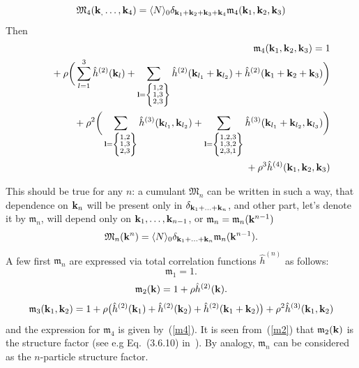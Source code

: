 \begin{equation}
	\mathfrak M_4(\vb k_, \dotsc, \vb k_4) = \langle N \rangle_0 \delta_{\vb k_1 + \vb k_2 + \vb k_3 + \vb k_4} \mathfrak m_4(\vb k_1, \vb k_2, \vb k_3) 
\end{equation}
Then
\begin{eqnarray}
	\label{m4}
	&& \mathfrak m_4(\vb k_1, \vb k_2, \vb k_3) =  1 
	\nonumber\\
	&& \quad{} + \rho \bigg(
	\sum_{l = 1}^3 \hat{h}^{(2)}(\vb k_l) +
	\sum_{\vb l = \left\{\substack{1,2 \\ 1,3 \\ 2,3} \right\} }  \hat{h}^{(2)} (\vb k_{l_1} + \vb k_{l_2})
	+ \hat{h}^{(2)} (\vb k_1 + \vb k_2 + \vb k_3)
	\bigg)
	\nonumber \\
	&&  \quad{} + \rho^2 \bigg(
	\sum_{\vb l = \left\{\substack{1,2 \\ 1,3 \\ 2,3 }\right\} }
	\hat{h}^{(3)}(\vb k_{l_1}, \vb k_{l_2})
	+ \sum_{\vb l = \left\{\substack{1,2,3 \\ 1,3,2 \\ 2,3,1}\right\} }
	\hat{h}^{(3)}(\vb k_{l_1} + \vb k_{l_2}, \vb k_{l_3})
	\bigg)
	\nonumber\\
	&& \quad{} + \rho^3 \hat{h}^{(4)} (\vb k_1, \vb k_2, \vb k_3)
\end{eqnarray}


This should be true for any $n$: a cumulant $\mathfrak M_n$ can be written in such a way, that dependence on $\vb k_n$ will be present only in $\delta_{\vb k_1 + \dotsc + \vb k_n}$, and other part, let's denote it by $\mathfrak m_n$, will depend only on $\vb k_1, \dotsc, \vb k_{n-1}$, or $\mathfrak m_n = \mathfrak m_n(\vb k^{n-1})$
\begin{equation}
	\mathfrak M_n(\vb k^n) = \langle N \rangle_0 \delta_{\vb k_1 + \dotsc + \vb k_n} \mathfrak m_n(\vb k^{n-1}).
\end{equation}
A few first $\mathfrak m_n$ are expressed via total correlation functions $\hat{h}^{(n)}$ as follows:
\begin{equation}
	\mathfrak{m}_1 = 1.
\end{equation}
\begin{equation}
	\label{m2}
	\mathfrak m_2(\vb k) = 1 + \rho \hat{h}^{(2)}(\vb k).
\end{equation}
\begin{equation}
	\label{m3}
	\mathfrak m_3(\vb k_1, \vb k_2) = 1 +  \rho \big(\hat{h}^{(2)}(\vb k_1) + \hat{h}^{(2)}(\vb k_2) + \hat{h}^{(2)}(\vb k_1 + \vb k_2) \big) 
	+ \rho^2 \hat{h}^{(3)}(\vb k_1, \vb k_2)
\end{equation}
and the expression for $\mathfrak m_4$ is given by~(\ref{m4}).
It is seen from~(\ref{m2}) that $\mathfrak m_2(\vb k)$ is the structure factor (see e.g Eq.~(3.6.10) in~\cite{HANSEN2013ch3}). By analogy, $\mathfrak{m}_n$ can be considered as the $n$-particle structure factor.

